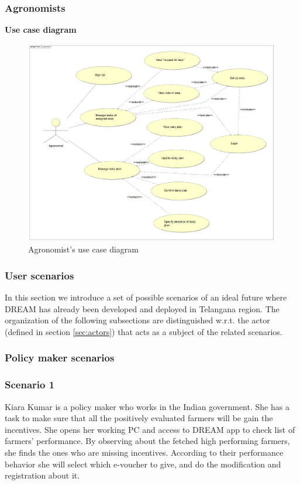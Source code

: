 \subsubsection{Agronomists}
\textbf{\textcolor{myblue}{Use case diagram}}
\begin{figure}[H]
	\centering
    \includegraphics[page=1, width=\textwidth]{Images/ud_ag.JPG}
	\caption{\label{fig:a_use_case_diagram}Agronomist's use case diagram}
\end{figure}
\label{sect:agronomist_requirements}


\subsubsection{User scenarios}
In this section we introduce a set of possible scenarios of an ideal future where DREAM has already been developed and deployed in Telangana region. The organization of the following subsections are distinguished w.r.t. the actor (defined in section \ref{sec:actors}) that acts as a subject of the related scenarios.
\subsubsection{Policy maker scenarios}

\subsubsection*{Scenario 1}
Kiara Kumar is a policy maker who works in the Indian government. She has a task to make sure that all the positively evaluated farmers will be gain the incentives. She opens her working PC and access to DREAM app to check list of farmers' performance. By observing about the fetched high performing farmers, she finds the ones who are missing incentives. According to their performance behavior she will select which e-voucher to give, and do the modification and registration about it.
